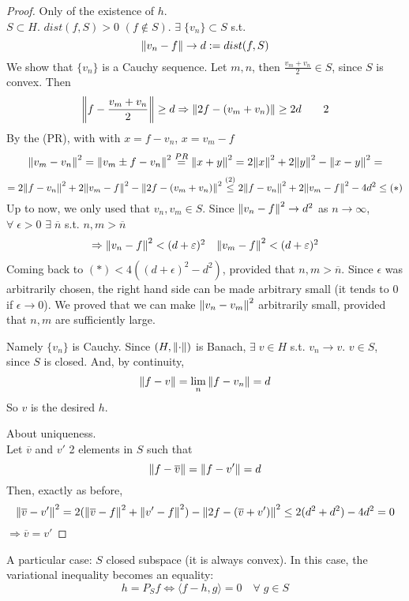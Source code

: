 \begin{proof}
    Only of the existence of \(h\). \\
    \(S \subset H\). \(dist(f, S) >0\) \((f \notin S )\). \(\exists \; \{v_n\} \subset S\) s.t. 
    \[
        \norm{v_n -f} \to d := dist(f, S)    
    \] 
    We show that \(\{v_n\}\) is a Cauchy sequence. Let \(m, n\), then \(\frac{v_m + v_n}{2} \in S\), since \(S\) is convex. Then 
    \[
        \norm{f - \frac{v_m + v_n}{2}} \geq d \Rightarrow \norm{2f - (v_m + v_n)} \geq 2d \tag*{2}
    \]
    By the (PR), with with \(x=f-v_n\), \(x=v_m-f\)
    \[
        \norm{v_m - v_n}^2 
        = \norm{v_m \pm f - v_n}^2 
        \overset{PR }{=} \norm{x+y}^2
        = 2\norm{x}^2 + 2 \norm{y}^2 - \norm{x-y}^2 =
    \]
    \[
        = 2 \norm{f-v_n}^2 + 2 \norm{v_m - f }^2 - \norm{2f - (v_m + v_n)}^2
        \overset{(2)}{\leq} 2 \norm{f - v_n}^2 + 2 \norm{v_m - f}^2 - 4d^2 \leq (*)
    \]
    Up to now, we only used that \(v_n , v_m \in S\). Since \(\norm{v_n -f }^2 \to d^2\) as \(n \to \infty\), \(\forall\; \epsilon>0 \) \(\exists \; \overline{n}\) s.t. \(n, m > \overline{n}\)
    \[
        \begin{array}{ll}
            \Rightarrow \norm{v_n - f}^2 < (d+\varepsilon)^2 & \norm{v_m - f}^2 < (d+\varepsilon)^2
        \end{array}
    \]
    Coming back to \((*)< 4((d+\epsilon)^2 -d^2)\), provided that \(n, m > \overline{n}\). Since \(\epsilon\) was arbitrarily chosen, the right hand side can be made arbitrary small (it tends to 0 if \(\epsilon \to 0\)). 
    We proved that we can make \(\norm{v_n - v_m}^2\) arbitrarily small, provided that \(n, m\) are sufficiently large.
    
    Namely \(\{v_n\}\) is Cauchy. Since \((H, \norm{\cdot})\) is Banach, \(\exists \; v \in H\) s.t. \(v_n \to v\). \(v \in S\), since \(S\) is closed. And, by continuity, 
    \[
        \norm{f-v} = \lim_n \norm{f - v_n} = d
    \]
    So \(v\) is the desired \(h\).
    
    About uniqueness. \\
    Let \(\overline{v}\) and \(v'\) 2 elements in \(S\) such that
    \[
        \norm{f- \overline{v}} = \norm{f - v'} = d
    \]
    Then, exactly as before, 
    \[
        \norm{\overline{v} - v'}^2 = 2(\norm{\overline{v} - f}^2 + \norm{v' -f}^2) - \norm{2f - (\overline{v}+v')}^2 \leq 2 (d^2+d^2)-4d^2 = 0
    \]
    \(\Rightarrow \overline{v} = v'\)
\end{proof}

\begin{remark}
    A particular case: \(S\) closed subspace (it is always convex). In this case, the variational inequality becomes an equality:
    \[
        h = P_S f \Leftrightarrow \langle f-h, g\rangle = 0 \quad  \forall \; g \in S
    \]
\end{remark}

